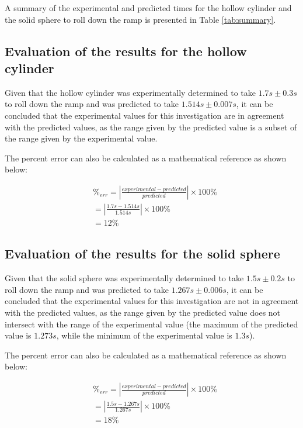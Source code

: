 \documentclass[letterpaper, 12pt]{article}
\begin{document}
A summary of the experimental and predicted times for the hollow cylinder
and the solid sphere to roll down the ramp is presented in Table
\ref*{tab:summary}.

\subsection{Evaluation of the results for the hollow cylinder}

Given that the hollow cylinder was experimentally determined to take
$1.7\unit{s} \pm 0.3\unit{s}$ to roll down the ramp and was predicted
to take $1.514\unit{s} \pm 0.007\unit{s}$, it can be concluded that
the experimental values for this investigation are in agreement
with the predicted values, as the range given by the predicted value
is a subset of the range given by the experimental value.

The percent error can also be calculated as a mathematical reference
as shown below:

\begin{align*}
     & \%_{err} = \left| \frac{experimental - predicted}{predicted} \right| \times 100\%
    \\
     & = \left| \frac{1.7\unit{s} - 1.514\unit{s}}{1.514\unit{s}} \right| \times 100\%
    \\
     & = 12\%
\end{align*}

\subsection{Evaluation of the results for the solid sphere}

Given that the solid sphere was experimentally determined to take
$1.5\unit{s} \pm 0.2\unit{s}$ to roll down the ramp and was predicted to take
$1.267\unit{s} \pm 0.006\unit{s}$, it can be concluded that the experimental
values for this investigation are not in agreement with the predicted values, as
the range given by the predicted value does not intersect with the range
of the experimental value (the maximum of the predicted value is
$1.273\unit{s}$, while the minimum of the experimental value is
$1.3\unit{s}$).

The percent error can also be calculated as a mathematical reference
as shown below:

\begin{align*}
     & \%_{err} = \left| \frac{experimental - predicted}{predicted} \right| \times 100\%
    \\
     & = \left| \frac{1.5\unit{s} - 1.267\unit{s}}{1.267\unit{s}} \right| \times 100\%
    \\
     & = 18\%
\end{align*}
\end{document}

